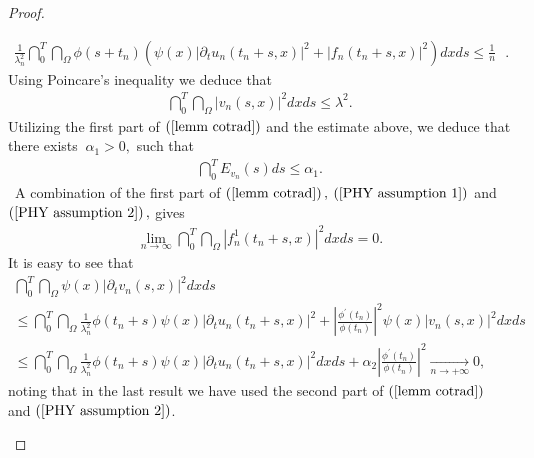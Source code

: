 \documentclass[11pt,reqno]{amsart}
\theoremstyle{plain}
\numberwithin{equation}{section}
\numberwithin{equation}{section}
\begin{document}
\begin{proof}
\begin{description}
\begin{equation}
\begin{array}{l}
\frac{1}{\lambda _{n}^{2}}\dint_{0}^{T}\dint_{\Omega }\phi \left(
s+t_{n}\right) \left( \psi \left( x\right) \left\vert \partial
_{t}u_{n}\left( t_{n}+s,x\right) \right\vert ^{2}+\left\vert f_{n}\left(
t_{n}+s,x\right) \right\vert ^{2}\right) dxds\leq \frac{1}{n}\text{ }.%
\end{array}
\label{lemm cotrad}
\end{equation}%
Using Poincare's inequality we deduce that%
\begin{equation*}
\begin{array}{c}
\dint_{0}^{T}\dint_{\Omega }\left\vert v_{n}\left( s,x\right) \right\vert
^{2}dxds\leq \lambda ^{2}.%
\end{array}%
\end{equation*}%
Utilizing the first part of $\left( \ref{lemm cotrad}\right) $ and the
estimate above, we deduce that there exists $~\alpha _{1}>0,$ such that 
\begin{equation*}
\begin{array}{c}
\dint_{0}^{T}E_{v_{n}}\left( s\right) ds\leq \alpha _{1}.%
\end{array}%
\end{equation*}%
\ A combination of the first part of $\left( \ref{lemm cotrad}\right) ,$ $%
\left( \ref{PHY assumption 1}\right) $ and $\left( \ref{PHY assumption 2}%
\right) ,$ gives 
\begin{equation*}
\begin{array}{c}
\underset{n\rightarrow \infty }{\lim }\dint_{0}^{T}\dint_{\Omega }\left\vert
f_{n}^{1}\left( t_{n}+s,x\right) \right\vert ^{2}dxds=0\text{.}%
\end{array}%
\end{equation*}%
It is easy to see that%
\begin{equation*}
\begin{array}{l}
\dint_{0}^{T}\dint_{\Omega }\psi \left( x\right) \left\vert \partial
_{t}v_{n}\left( s,x\right) \right\vert ^{2}dxds \\ 
\leq \dint_{0}^{T}\dint_{\Omega }\frac{1}{\lambda _{n}^{2}}\phi \left(
t_{n}+s\right) \psi \left( x\right) \left\vert \partial _{t}u_{n}\left(
t_{n}+s,x\right) \right\vert ^{2}+\left\vert \frac{\phi ^{\prime }\left(
t_{n}\right) }{\phi \left( t_{n}\right) }\right\vert ^{2}\psi \left(
x\right) \left\vert v_{n}\left( s,x\right) \right\vert ^{2}dxds \\ 
\leq \dint_{0}^{T}\dint_{\Omega }\frac{1}{\lambda _{n}^{2}}\phi \left(
t_{n}+s\right) \psi \left( x\right) \left\vert \partial _{t}u_{n}\left(
t_{n}+s,x\right) \right\vert ^{2}dxds+\alpha _{2}\left\vert \frac{\phi
^{\prime }\left( t_{n}\right) }{\phi \left( t_{n}\right) }\right\vert ^{2}%
\underset{n\rightarrow +\infty }{\longrightarrow }0,%
\end{array}%
\end{equation*}%
noting that in the last result we have used the second part of $\left( \ref%
{lemm cotrad}\right) $ and $\left( \ref{PHY assumption 2}\right) $.


\end{description}
\end{proof}
\end{document}
